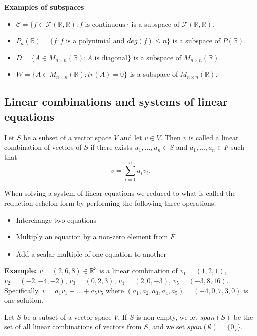 \documentclass[12pt]{article}
\newenvironment{definition}[2][Definition]{\begin{trivlist}
\item[\hskip \labelsep {\bfseries #1}\hskip \labelsep {\bfseries #2}]}{\end{trivlist}}
\begin{document}
\textbf{Examples of subspaces}

\begin{itemize}
    \item[(1)] $\mathcal{C} = \{f \in \mathcal{F}(\mathbb{R}, \mathbb{R}) : f \text{ is continuous}\}$ is a subspace of $\mathcal{F}(\mathbb{R}, \mathbb{R})$.
    \item[(2)] $P_n(\mathbb{R}) = \{f : f \text{ is a polynimial and } deg(f) \leq n\}$ is a subspace of $P(\mathbb{R})$.
    \item[(3)] $D = \{A \in M_{n \times n}(\mathbb{R}) : A \text{ is diagonal}\}$ is a subspace of $M_{n \times n}(\mathbb{R})$.
    \item[(4)] $W = \{A \in  M_{n \times n}(\mathbb{R}) : tr(A) = 0\}$ is a subspace of $ M_{n \times n}(\mathbb{R})$.
\end{itemize}

\subsection{Linear combinations and systems of linear equations}

\begin{definition}{4}
Let $S$ be a subset of a vector space $V$ and let $v \in V$. Then $v$ is called a linear combination of vectors of $S$ if there exists $u_1, \dots, u_n \in S$ and $a_1, \dots, a_n \in F$ such that $$v = \sum_{i = 1}^na_iv_i.$$
\end{definition}

\noindent When solving a system of linear equations we reduced to what is called the reduction echelon form by performing the following three operations.

\begin{itemize}
    \item Interchange two equations
    \item Multiply an equation by a non-zero element from $F$
    \item Add a scalar multiple of one equation to another
\end{itemize}

\noindent\textbf{Example:} $v = (2, 6, 8) \in \mathbb{R}^3$ is a linear combination of $v_1 = (1, 2, 1)$, $v_2 = (-2, -4, -2)$, $v_3 = (0, 2, 3)$, $v_4 = (2, 0, -3)$, $v_5 = (-3, 8, 16)$. Specifically, $v = a_1v_1 + \dots + a_5v_5$ where $(a_1, a_2, a_3, a_4, a_5) = (-4, 0, 7, 3, 0)$ is one solution. 

\begin{definition}{5}
Let $S$ be a subset of a vector space $V$. If $S$ is non-empty, we let $span(S)$ be the set of all linear combinations of vectors from $S$, and we set $span(\emptyset) = \{0_V\}$.
\end{definition}
\end{document}
